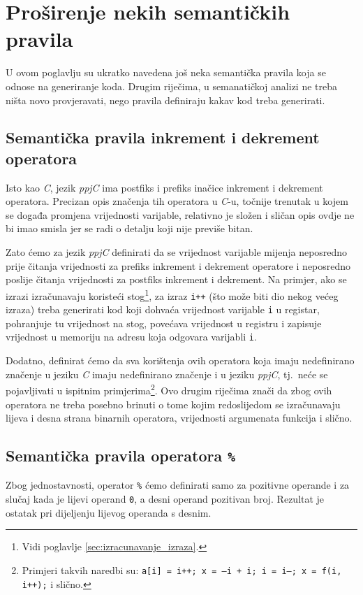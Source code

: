 \documentclass[times, 12pt, utf8]{book}
\begin{document}
\section{Proširenje nekih semantičkih pravila}
U ovom poglavlju su ukratko navedena još neka semantička pravila koja se odnose na generiranje koda.
Drugim riječima, u semanatičkoj analizi ne treba ništa novo provjeravati, nego pravila definiraju kakav kod treba generirati.

\subsection{Semantička pravila inkrement i dekrement operatora}
Isto kao \emph{C}, jezik \emph{ppjC} ima postfiks i prefiks inačice inkrement i dekrement operatora.
Precizan opis značenja tih operatora u \emph{C}-u, točnije trenutak u kojem se događa promjena vrijednosti varijable, relativno je složen i sličan opis ovdje ne bi imao smisla jer se radi o detalju koji nije previše bitan.

Zato ćemo za jezik \emph{ppjC} definirati da se vrijednost varijable mijenja neposredno prije čitanja vrijednosti za prefiks inkrement i dekrement operatore i neposredno poslije čitanja vrijednosti za postfiks inkrement i dekrement.
Na primjer, ako se izrazi izračunavaju koristeći stog\footnote{Vidi poglavlje \ref{sec:izracunavanje_izraza}.}, za izraz \verb|i++| (što može biti dio nekog većeg izraza) treba generirati kod koji dohvaća vrijednost varijable \verb|i| u registar, pohranjuje tu vrijednost na stog, povećava vrijednost u registru i zapisuje vrijednost u memoriju na adresu koja odgovara varijabli \verb|i|.

Dodatno, definirat ćemo da sva korištenja ovih operatora koja imaju nedefinirano značenje u jeziku \emph{C} imaju nedefinirano značenje i u jeziku \emph{ppjC}, tj.~neće se pojavljivati u ispitnim primjerima\footnote{Primjeri takvih naredbi su: \texttt{a[i] = i++; x = --i + i; i = i--; x = f(i, i++);} i slično.}.
Ovo drugim riječima znači da zbog ovih operatora ne treba posebno brinuti o tome kojim redoslijedom se izračunavaju lijeva i desna strana binarnih operatora, vrijednosti argumenata funkcija i slično.

\subsection{Semantička pravila operatora \texttt{\%}}
Zbog jednostavnosti, operator \verb|%| ćemo definirati samo za pozitivne operande i za slučaj kada je lijevi operand \verb|0|, a desni operand pozitivan broj.
Rezultat je ostatak pri dijeljenju lijevog operanda s desnim.
\end{document}
